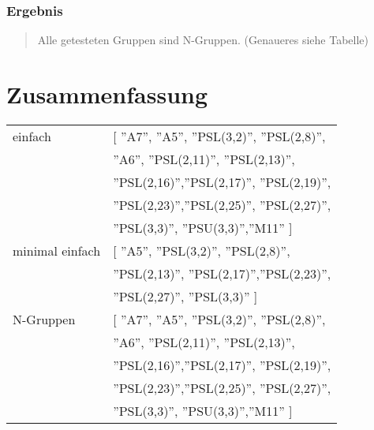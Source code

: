 \documentclass{beamer}
\begin{document}
\begin{frame}
	\frametitle{Ergebnis}
\begin{quote}
 Alle getesteten Gruppen sind N-Gruppen. (Genaueres siehe Tabelle)
\end{quote}
		 
\section{Zusammenfassung}
\end{frame}
\begin{frame}
\begin{tabular}{ll}
einfach & 	[ ''A7'', ''A5'', ''PSL(3,2)'', ''PSL(2,8)'',\\
&		 ''A6'', ''PSL(2,11)'', ''PSL(2,13)'', \\
&		 ''PSL(2,16)'',''PSL(2,17)'', ''PSL(2,19)'', \\
&		 ''PSL(2,23)'',''PSL(2,25)'', ''PSL(2,27)'', \\
&		''PSL(3,3)'', ''PSU(3,3)'',''M11'' ]\\
minimal einfach & [ ''A5'', ''PSL(3,2)'', ''PSL(2,8)'', \\ 
&		''PSL(2,13)'', ''PSL(2,17)'',''PSL(2,23)'', \\
&		''PSL(2,27)'', ''PSL(3,3)'' ]\\
N-Gruppen & 	[ ''A7'', ''A5'', ''PSL(3,2)'', ''PSL(2,8)'',\\
&		 ''A6'', ''PSL(2,11)'', ''PSL(2,13)'', \\
&		 ''PSL(2,16)'',''PSL(2,17)'', ''PSL(2,19)'', \\
&		 ''PSL(2,23)'',''PSL(2,25)'', ''PSL(2,27)'', \\
&		''PSL(3,3)'', ''PSU(3,3)'',''M11'' ]\\

	 \end{tabular}\\
\end{frame}
\end{document}
